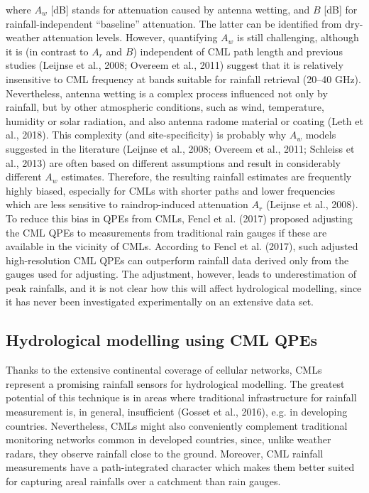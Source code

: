 \documentclass{ctuthesis}\usepackage[]{graphicx}\usepackage[]{color}
\begin{document}
where $A_w$ [dB] stands for attenuation caused by antenna wetting, and $B$ [dB] for rainfall-independent \enquote{baseline} attenuation. The latter can be identified from dry-weather attenuation levels. However, quantifying $A_w$ is still challenging, although it is (in contrast to $A_r$ and $B$) independent of CML path length and previous studies (Leijnse et al., 2008; Overeem et al., 2011) suggest that it is relatively insensitive to CML frequency at bands suitable for rainfall retrieval (20--40 GHz). Nevertheless, antenna wetting is a complex process influenced not only by rainfall, but by other atmospheric conditions, such as wind, temperature, humidity or solar radiation, and also antenna radome material or coating (Leth et al., 2018). This complexity (and site-specificity) is probably why $A_w$ models suggested in the literature (Leijnse et al., 2008; Overeem et al., 2011; Schleiss et al., 2013) are often based on different assumptions and result in considerably different $A_w$ estimates. Therefore, the resulting rainfall estimates are frequently highly biased, especially for CMLs with shorter paths and lower frequencies which are less sensitive to raindrop-induced attenuation $A_r$ (Leijnse et al., 2008). To reduce this bias in QPEs from CMLs, Fencl et al. (2017) proposed adjusting the CML QPEs to measurements from traditional rain gauges if these are available in the vicinity of CMLs. According to Fencl et al. (2017), such adjusted high-resolution CML QPEs can outperform rainfall data derived only from the gauges used for adjusting. The adjustment, however, leads to underestimation of peak rainfalls, and it is not clear how this will affect hydrological modelling, since it has never been investigated experimentally on an extensive data set.

\subsection{Hydrological modelling using CML QPEs}

Thanks to the extensive continental coverage of cellular networks, CMLs represent a promising rainfall sensors for hydrological modelling. The greatest potential of this technique is in areas where traditional infrastructure for rainfall measurement is, in general, insufficient (Gosset et al., 2016), e.g. in developing countries. Nevertheless, CMLs might also conveniently complement traditional monitoring networks common in developed countries, since, unlike weather radars, they observe rainfall close to the ground. Moreover, CML rainfall measurements have a path-integrated character which makes them better suited for capturing areal rainfalls over a catchment than rain gauges. 
\end{document}
